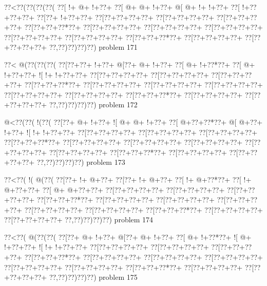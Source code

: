\vbox{\vbox{\goo
\0??<\0??(\0??(\0??(\0??(
\0??[\- !+\- @+\- !+\0??+
\0??[\- @+\- @+\- !+\0??+
\- @[\- @+\- !+\- !+\0??+
\0??[\- !+\0??+\0??+\0??+
\0??[\0??+\- !+\0??+\0??+
\0??[\0??+\0??+\0??+\0??+
\0??[\0??+\0??+\0??+\0??+
\0??[\0??+\0??+\0??+\0??+
\0??[\0??+\0??+\0??*\0??+
\0??[\0??+\0??+\0??+\0??+
\0??[\0??+\0??+\0??+\0??+
\0??[\0??+\0??+\0??+\0??+
\0??[\0??+\0??+\0??+\0??+
\0??[\0??+\0??+\0??+\0??+
\0??[\0??+\0??+\0??*\0??+
\0??[\0??+\0??+\0??+\0??+
\0??[\0??+\0??+\0??+\0??+
\0??,\0??)\0??)\0??)\0??)
}
\hfil problem 171\hfil\break
}

\vbox{\vbox{\goo
\0??<\- @(\0??(\0??(\0??(
\0??[\0??+\0??+\- !+\0??+
\- @[\0??+\- @+\- !+\0??+
\0??[\- @+\- !+\0??*\0??+
\0??[\- @+\- !+\0??+\0??+
\- ![\- !+\- !+\0??+\0??+
\0??[\0??+\0??+\0??+\0??+
\0??[\0??+\0??+\0??+\0??+
\0??[\0??+\0??+\0??+\0??+
\0??[\0??+\0??+\0??*\0??+
\0??[\0??+\0??+\0??+\0??+
\0??[\0??+\0??+\0??+\0??+
\0??[\0??+\0??+\0??+\0??+
\0??[\0??+\0??+\0??+\0??+
\0??[\0??+\0??+\0??+\0??+
\0??[\0??+\0??+\0??*\0??+
\0??[\0??+\0??+\0??+\0??+
\0??[\0??+\0??+\0??+\0??+
\0??,\0??)\0??)\0??)\0??)
}
\hfil problem 172\hfil\break
}

\vbox{\vbox{\goo
\- @<\0??(\0??(\- !(\0??(
\0??[\0??+\- @+\- !+\0??+
\- ![\- @+\- @+\- !+\0??+
\0??[\- @+\0??+\0??*\0??+
\- @[\- @+\0??+\- !+\0??+
\- ![\- !+\- !+\0??+\0??+
\0??[\0??+\0??+\0??+\0??+
\0??[\0??+\0??+\0??+\0??+
\0??[\0??+\0??+\0??+\0??+
\0??[\0??+\0??+\0??*\0??+
\0??[\0??+\0??+\0??+\0??+
\0??[\0??+\0??+\0??+\0??+
\0??[\0??+\0??+\0??+\0??+
\0??[\0??+\0??+\0??+\0??+
\0??[\0??+\0??+\0??+\0??+
\0??[\0??+\0??+\0??*\0??+
\0??[\0??+\0??+\0??+\0??+
\0??[\0??+\0??+\0??+\0??+
\0??,\0??)\0??)\0??)\0??)
}
\hfil problem 173\hfil\break
}

\vbox{\vbox{\goo
\0??<\0??(\- !(\- @(\0??(
\0??[\0??+\- !+\- @+\0??+
\0??[\0??+\- !+\- @+\0??+
\0??[\- !+\- @+\0??*\0??+
\0??[\- !+\- @+\0??+\0??+
\0??[\- @+\- @+\0??+\0??+
\0??[\0??+\0??+\0??+\0??+
\0??[\0??+\0??+\0??+\0??+
\0??[\0??+\0??+\0??+\0??+
\0??[\0??+\0??+\0??*\0??+
\0??[\0??+\0??+\0??+\0??+
\0??[\0??+\0??+\0??+\0??+
\0??[\0??+\0??+\0??+\0??+
\0??[\0??+\0??+\0??+\0??+
\0??[\0??+\0??+\0??+\0??+
\0??[\0??+\0??+\0??*\0??+
\0??[\0??+\0??+\0??+\0??+
\0??[\0??+\0??+\0??+\0??+
\0??,\0??)\0??)\0??)\0??)
}
\hfil problem 174\hfil\break
}

\vbox{\vbox{\goo
\0??<\0??(\- @(\0??(\0??(
\0??[\0??+\- @+\- !+\0??+
\- @[\0??+\- @+\- !+\0??+
\0??[\- @+\- !+\0??*\0??+
\- ![\- @+\- !+\0??+\0??+
\- ![\- !+\- !+\0??+\0??+
\0??[\0??+\0??+\0??+\0??+
\0??[\0??+\0??+\0??+\0??+
\0??[\0??+\0??+\0??+\0??+
\0??[\0??+\0??+\0??*\0??+
\0??[\0??+\0??+\0??+\0??+
\0??[\0??+\0??+\0??+\0??+
\0??[\0??+\0??+\0??+\0??+
\0??[\0??+\0??+\0??+\0??+
\0??[\0??+\0??+\0??+\0??+
\0??[\0??+\0??+\0??*\0??+
\0??[\0??+\0??+\0??+\0??+
\0??[\0??+\0??+\0??+\0??+
\0??,\0??)\0??)\0??)\0??)
}
\hfil problem 175\hfil\break
}

